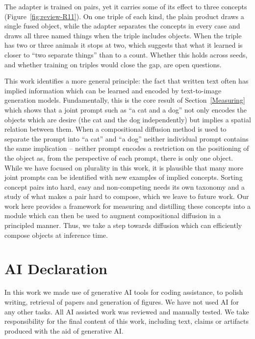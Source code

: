 \documentclass{article} %
\begin{document}
The adapter is trained on pairs, yet it carries some of its effect to three concepts (Figure~\ref{fig:review-R11}). On one triple of each kind, the plain product draws a single fused object, while the adapter separates the concepts in every case and draws all three named things when the triple includes objects. When the triple has two or three animals it stops at two, which suggests that what it learned is closer to ``two separate things'' than to a count. Whether this holds across seeds, and whether training on triples would close the gap, are open questions.

This work identifies a more general principle: the fact that written text often has implied information which can be learned and encoded by text-to-image generation models. Fundamentally, this is the core result of Section~\ref{Measuring} which shows that a joint prompt such as ``a cat and a dog'' not only encodes the objects which are desire (the cat and the dog independently) but implies a spatial relation between them. When a compositional diffusion method is used to separate the prompt into ``a cat'' and ``a dog'' neither individual prompt contains the same implication -- neither prompt encodes a restriction on the positioning of the object as, from the perspective of each prompt, there is only one object. While we have focused on plurality in this work, it is plausible that many more joint prompts can be identified with new examples of implied concepts. Sorting concept pairs into hard, easy and non-competing needs its own taxonomy and a study of what makes a pair hard to compose, which we leave to future work. Our work here provides a framework for measuring and distilling these concepts into a module which can then be used to augment compositional diffusion in a principled manner. Thus, we take a step towards diffusion which can efficiently compose objects at inference time.

\section{AI Declaration}
In this work we made use of generative AI tools for coding assistance, to polish writing, retrieval of papers and generation of figures. We have not used AI for any other tasks. All AI assisted work was reviewed and manually tested. We take responsibility for the final content of this work, including text, claims or artifacts produced with the aid of generative AI.

\end{document}
